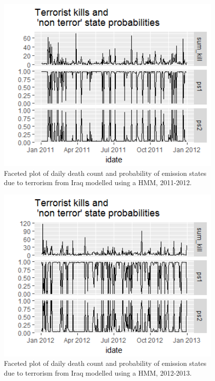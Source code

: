 \begin{figure}[t]
\includegraphics[width=15cm]{Peters_experiment_markdown_files/figure-latex/Rplot02_2011_2012.png}
\caption{Faceted plot of daily death count and probability of emission states due to terrorism from Iraq modelled using a HMM, 2011-2012.}
\label{fig:Rplot02_2011_2012}
\centering
\end{figure}

\begin{figure}[t]
\includegraphics[width=15cm]{Peters_experiment_markdown_files/figure-latex/Rplot02_2012_2013_HMM.png}
\caption{Faceted plot of daily death count and probability of emission states due to terrorism from Iraq modelled using a HMM, 2012-2013.}
\label{fig:Rplot02_2012_2013_HMM}
\centering
\end{figure}

